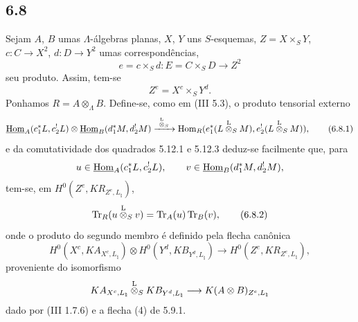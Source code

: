\subsection*{6.8}
Sejam $A$, $B$ umas $\Lambda$-álgebras planas, $X$, $Y$ uns $S$-esquemas, $Z=X\times_SY$, $c:C\to X^2$, $d:D\to Y^2$ umas correspondências,
\[
e=c\times_Sd:E=C\times_SD\longrightarrow Z^2
\]
seu produto. Assim, tem-se
\[
Z^e=X^c\times_SY^d.
\]
Ponhamos $R=A\otimes_{\Lambda}B$. Define-se, como em (III 5.3), o produto tensorial externo
\begin{equation}
\underline{\operatorname{Hom}}_A(c_1^*L,c_2^!L)\otimes \underline{\operatorname{Hom}}_B(d_1^*M,d_2^!M)
\xrightarrow{\ \overset{\mathrm L}{\otimes}_S\ }
\operatorname{Hom}_R(e_1^*(L\overset{\mathrm L}{\otimes}_SM),e_2^!(L\overset{\mathrm L}{\otimes}_SM)),
\tag{6.8.1}
\end{equation}
e da comutatividade dos quadrados 5.12.1 e 5.12.3 deduz-se facilmente que, para
\[
u\in\underline{\operatorname{Hom}}_A(c_1^*L,c_2^!L),\qquad v\in\underline{\operatorname{Hom}}_B(d_1^*M,d_2^!M),
\]
tem-se, em $H^0(Z^e,KR_{Z^e,L_{\natural}})$,
\begin{equation}
\operatorname{Tr}_R(u\overset{\mathrm L}{\otimes}_Sv)=\operatorname{Tr}_A(u)\operatorname{Tr}_B(v),
\tag{6.8.2}
\end{equation}
onde o produto do segundo membro é definido pela flecha canônica
\begin{equation}
H^0(X^c,KA_{X^c,L_{\natural}})\otimes
H^0(Y^d,KB_{Y^d,L_{\natural}})
\longrightarrow
H^0(Z^e,KR_{Z^e,L_{\natural}}),
\tag{6.8.3}
\end{equation}
proveniente do isomorfismo
\[
KA_{X^c,L_{\natural}}\overset{\mathrm L}{\otimes}_S KB_{Y^d,L_{\natural}}\longrightarrow K(A\otimes B)_{Z^e,L_{\natural}}
\]
dado por (III 1.7.6) e a flecha (4) de 5.9.1.
